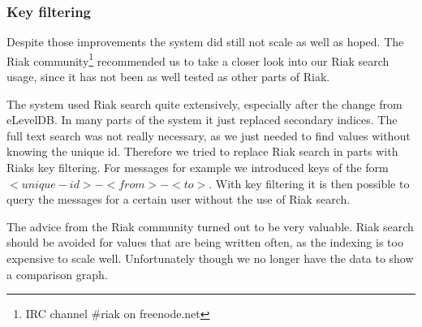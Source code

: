 \documentclass[11pt,a4paper]{report}
\begin{document}
\subsubsection{Key filtering}
\label{sec:load_tests:key_filtering}
Despite those improvements the system did still not scale as well as hoped.
The Riak community\footnote{IRC channel \#riak on freenode.net} recommended
us to take a closer look into our Riak search usage,
since it has not been as well tested as other parts of Riak.

The system used Riak search quite extensively, especially after the change from eLevelDB.
In many parts of the system it just replaced secondary indices.
The full text search was not really necessary, as we just needed to find values
without knowing the unique id.
Therefore we tried to replace Riak search in parts with Riaks key filtering.
For messages for example we introduced keys of the form $<unique-id>-<from>-<to>$.
With key filtering it is then possible to query the messages for a certain user without
the use of Riak search.

The advice from the Riak community turned out to be very valuable.
Riak search should be avoided for values that are being written often,
as the indexing is too expensive to scale well.
Unfortunately though we no longer have the data to show a comparison graph.
\end{document}
